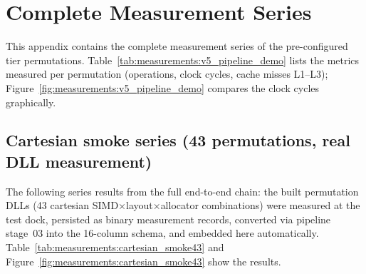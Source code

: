 \chapter{Complete Measurement Series}\label{app:measurements}


This appendix contains the complete measurement series of the pre-configured tier
permutations. Table~\ref{tab:measurements:v5_pipeline_demo} lists the metrics
measured per permutation (operations, clock cycles, cache misses L1--L3);
Figure~\ref{fig:measurements:v5_pipeline_demo} compares the clock cycles
graphically.




\section{Cartesian smoke series (43 permutations, real DLL measurement)}

The following series results from the full end-to-end chain: the built permutation DLLs
(43 cartesian SIMD$\times$layout$\times$allocator combinations) were measured at the test dock,
persisted as binary measurement records, converted via pipeline stage~03 into the 16-column
schema, and embedded here automatically.
Table~\ref{tab:measurements:cartesian_smoke43} and
Figure~\ref{fig:measurements:cartesian_smoke43} show the results.



